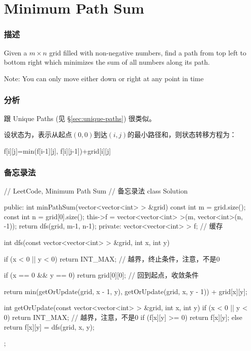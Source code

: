 \section{Minimum Path Sum} %
\label{sec:minimum-path-sum}


\subsubsection{描述}
Given a $m \times n$ grid filled with non-negative numbers, find a path from top left to bottom right which minimizes the sum of all numbers along its path.

Note: You can only move either down or right at any point in time


\subsubsection{分析}
跟 Unique Paths (见 \S \ref{sec:unique-paths}) 很类似。

设状态为，表示从起点$(0,0)$到达$(i,j)$的最小路径和，则状态转移方程为：
\begin{Code}
f[i][j]=min(f[i-1][j], f[i][j-1])+grid[i][j]
\end{Code}


\subsubsection{备忘录法}
\begin{Code}
// LeetCode, Minimum Path Sum
// 备忘录法
class Solution {
public:
    int minPathSum(vector<vector<int> > &grid) {
        const int m = grid.size();
        const int n = grid[0].size();
        this->f = vector<vector<int> >(m, vector<int>(n, -1));
        return dfs(grid, m-1, n-1);
    }
private:
    vector<vector<int> > f;  // 缓存

    int dfs(const vector<vector<int> > &grid, int x, int y) {
        if (x < 0 || y < 0) return INT_MAX; // 越界，终止条件，注意，不是0

        if (x == 0 && y == 0) return grid[0][0]; // 回到起点，收敛条件

        return min(getOrUpdate(grid, x - 1, y),
                getOrUpdate(grid, x, y - 1)) + grid[x][y];
    }

    int getOrUpdate(const vector<vector<int> > &grid, int x, int y) {
        if (x < 0 || y < 0) return INT_MAX; // 越界，注意，不是0
        if (f[x][y] >= 0) return f[x][y];
        else return f[x][y] = dfs(grid, x, y);
    }
};
\end{Code}


